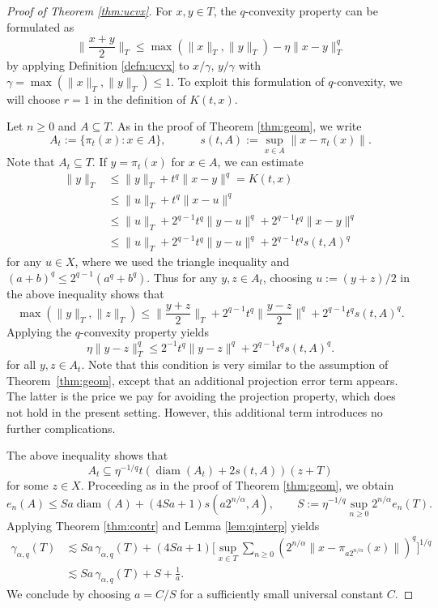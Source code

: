 \documentclass[10pt,reqno]{amsart}
\theoremstyle{definition}
\numberwithin{equation}{section}
\numberwithin{figure}{section}
\numberwithin{table}{section}
\newcommand{\diam}{\mathop{\mathrm{diam}}}
\begin{document}
\begin{proof}[Proof of Theorem \ref{thm:ucvx}]
For $x,y\in T$, the $q$-convexity property can be formulated as
$$
	\bigg\|\frac{x+y}{2}\bigg\|_T \le 
	\max(\|x\|_T,\|y\|_T) -\eta\|x-y\|_T^q
$$
by applying Definition \ref{defn:ucvx} to $x/\gamma$, $y/\gamma$ with
$\gamma=\max(\|x\|_T,\|y\|_T)\le 1$. To exploit this formulation of
$q$-convexity, we will choose $r=1$ in the definition of $K(t,x)$.

Let $n\ge 0$ and $A\subseteq T$. As in the proof of Theorem 
\ref{thm:geom}, we write
$$
	A_t := \{\pi_t(x):x\in A\},\qquad\quad
	s(t,A) := \sup_{x\in A}\|x-\pi_t(x)\|.
$$
Note that $A_t\subseteq T$. If $y=\pi_t(x)$ for $x\in A$, we can estimate
\begin{align*}
	\|y\|_T & \le \|y\|_T + t^q\|x-y\|^q = K(t,x) \\
	&\le
	\|u\|_T + t^q\|x-u\|^q \\
	& \le
	\|u\|_T + 2^{q-1}t^q\|y-u\|^q +
	2^{q-1}t^q\|x-y\|^q \\
	& \le
	\|u\|_T + 2^{q-1}t^q\|y-u\|^q +
	2^{q-1}t^qs(t,A)^q
\end{align*}
for any $u\in X$, where we used the triangle inequality and
$(a+b)^q\le 2^{q-1}(a^q+b^q)$. Thus for any $y,z\in A_t$, choosing
$u:=(y+z)/2$ in the above inequality shows that
$$
	\max(\|y\|_T,\|z\|_T) \le
	\bigg\|\frac{y+z}{2}\bigg\|_T 
	+ 2^{q-1}t^q\bigg\|\frac{y-z}{2}\bigg\|^q +
	2^{q-1}t^qs(t,A)^q.
$$
Applying the $q$-convexity property yields
$$
	\eta\|y-z\|_T^q \le
	2^{-1}t^q\|y-z\|^q +
	2^{q-1}t^qs(t,A)^q.
$$
for all $y,z\in A_t$. Note that this condition is very similar to the 
assumption of Theorem~\ref{thm:geom}, except that an additional projection 
error term appears. The latter is the price we pay for avoiding the
projection property, which does not hold in the present setting. However, 
this additional term introduces no further complications.

The above inequality shows that
$$
	A_t \subseteq 
	\eta^{-1/q}t (\diam(A_t) + 2s(t,A))(z+T)
$$
for some $z\in X$. Proceeding as in the proof of Theorem \ref{thm:geom},
we obtain
$$	e_n(A) \le Sa\diam(A) + (4Sa+1)s(a2^{n/\alpha},A),\qquad
	S := \eta^{-1/q}\sup_{n\ge 0}2^{n/\alpha}e_n(T).
$$
Applying Theorem \ref{thm:contr} and Lemma \ref{lem:qinterp} yields
\begin{align*}
	\gamma_{\alpha,q}(T) &\lesssim
	Sa\,\gamma_{\alpha,q}(T) +
	(4Sa+1)
	\Bigg[\sup_{x\in T}
	\sum_{n\ge 0}(2^{n/\alpha}\|x-\pi_{a2^{n/\alpha}}(x)\|)^q
	\Bigg]^{1/q} \\
	&\lesssim
	Sa\,\gamma_{\alpha,q}(T) +
	S + \frac{1}{a}.
\end{align*}
We conclude by choosing $a=C/S$ for a sufficiently small universal
constant $C$.
\end{proof}
\end{document}
